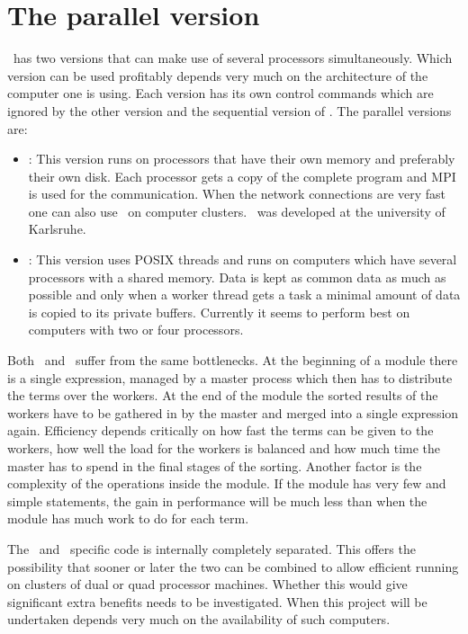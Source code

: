 
\chapter{The parallel version}
\label{parallel}


\FORM\ has two versions that can make use of several processors 
simultaneously. Which version can be used profitably depends very much on 
the architecture of the computer one is using. Each version has its own 
control commands which are ignored by the other version and the sequential 
version of \FORM. The parallel versions are:
\begin{itemize}
\item \ParFORM{}: This version runs on processors that have 
their own memory and preferably their own disk. Each processor gets a copy 
of the complete program and MPI is used for the 
communication. When the network connections are very 
fast one can also use \ParFORM\ on computer clusters. \ParFORM\ was 
developed at the university of Karlsruhe.
\item \TFORM{}: This version uses POSIX threads and runs on computers 
which have several processors with a shared memory. Data is kept as common 
data as much as possible and only when a worker thread gets a task a 
minimal amount of data is copied to its private buffers. Currently it seems 
to perform best on computers with two or four processors.
\end{itemize}
Both \ParFORM\ and \TFORM\ suffer from the same bottlenecks. 
At the beginning of a module there is a single expression, managed by a 
master process which then has to distribute the terms over the workers. At 
the end of the module the sorted results of the workers have to be gathered 
in by the master and merged into a single expression again. 
Efficiency depends critically on how fast the terms can be given to the 
workers, how well the load for the workers is balanced and 
how much time the master has to spend in the final stages of the sorting. 
Another factor is the complexity of the operations inside the module. If 
the module has very few and simple statements, the gain in performance will 
be much less than when the module has much work to do for each term.

The \ParFORM\ and \TFORM\ specific code is internally completely separated. 
This offers the possibility that sooner or later the two can be combined to 
allow efficient running on clusters of dual or quad processor machines. 
Whether this would give significant extra benefits needs to be 
investigated. When this project will be undertaken depends very much on the 
availability of such computers.

